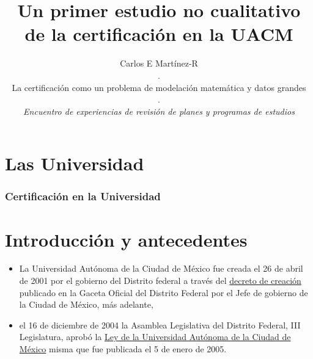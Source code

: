 \documentclass[xcolor=dvipsnames]{beamer}
\title{Un primer estudio no cualitativo de la certificaci\'on en la UACM}
\author{Carlos E Mart\'inez-R\\
.\\
\tiny{La certificaci\'on como un problema de modelaci\'on
matem\'atica y datos grandes}\\
.\\
\tiny{\textit{Encuentro de experiencias de revisi\'on de planes y programas de estudios}}
}
\begin{document}
%
\begin{frame}
  \maketitle

\end{frame}


\section*{}
\small
\begin{frame}
\tableofcontents
\end{frame}
%


\section{Las Universidad}


\begin{frame}\frametitle{Certificaci\'on en la Universidad}



\section{Introducci\'on y antecedentes}

\begin{itemize}

\item La Universidad Aut\'onoma de la Ciudad de M\'exico fue creada el 26 de abril de 2001 por el gobierno del Distrito federal a trav\'es del \href{https://www.uacm.edu.mx/Portals/0/adam/Content/hfXbhKHHXE2k2Y8j2fG9UQ/Text/DCUACM.pdf}{decreto de creaci\'on} publicado en la Gaceta Oficial del Distrito Federal por el Jefe de gobierno de la Ciudad de M\'exico, m\'as adelante, 

\item el 16 de diciembre de 2004 la Asamblea Legislativa del Distrito Federal, III Legislatura, aprob\'o la \href{https://www.uacm.edu.mx/Portals/0/ley_uacm092011.pdf}{Ley de la Universidad Aut\'onoma de la Ciudad de M\'exico} misma que fue publicada el 5 de enero de 2005.



\end{itemize}





\end{frame}
\end{document}
